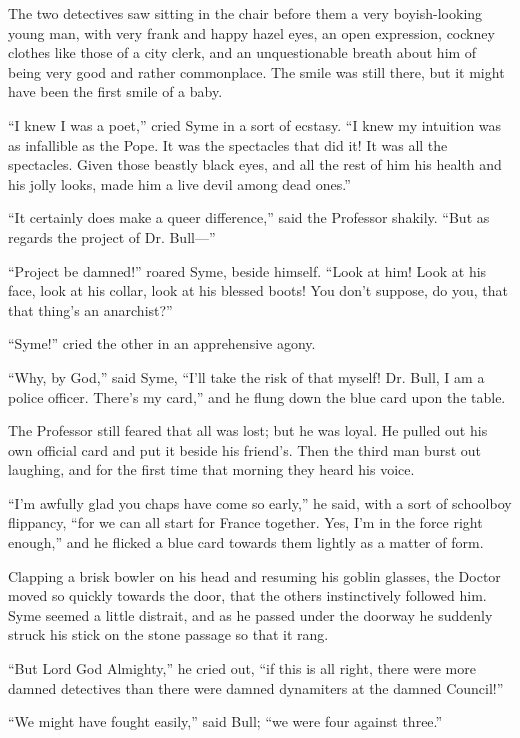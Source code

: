 The two detectives saw sitting in the chair before them a very boyish-looking young man, with very frank and happy hazel eyes, an open expression, cockney clothes like those of a city clerk, and an unquestionable breath about him of being very good and rather commonplace. The smile was still there, but it might have been the first smile of a baby.

“I knew I was a poet,” cried Syme in a sort of ecstasy. “I knew my intuition was as infallible as the Pope. It was the spectacles that did it! It was all the spectacles. Given those beastly black eyes, and all the rest of him his health and his jolly looks, made him a live devil among dead ones.”

“It certainly does make a queer difference,” said the Professor shakily. “But as regards the project of Dr. Bull⁠—”

“Project be damned!” roared Syme, beside himself. “Look at him! Look at his face, look at his collar, look at his blessed boots! You don’t suppose, do you, that that thing’s an anarchist?”

“Syme!” cried the other in an apprehensive agony.

“Why, by God,” said Syme, “I’ll take the risk of that myself! Dr. Bull, I am a police officer. There’s my card,” and he flung down the blue card upon the table.

The Professor still feared that all was lost; but he was loyal. He pulled out his own official card and put it beside his friend’s. Then the third man burst out laughing, and for the first time that morning they heard his voice.

“I’m awfully glad you chaps have come so early,” he said, with a sort of schoolboy flippancy, “for we can all start for France together. Yes, I’m in the force right enough,” and he flicked a blue card towards them lightly as a matter of form.

Clapping a brisk bowler on his head and resuming his goblin glasses, the Doctor moved so quickly towards the door, that the others instinctively followed him. Syme seemed a little distrait, and as he passed under the doorway he suddenly struck his stick on the stone passage so that it rang.

“But Lord God Almighty,” he cried out, “if this is all right, there were more damned detectives than there were damned dynamiters at the damned Council!”

“We might have fought easily,” said Bull; “we were four against three.”

